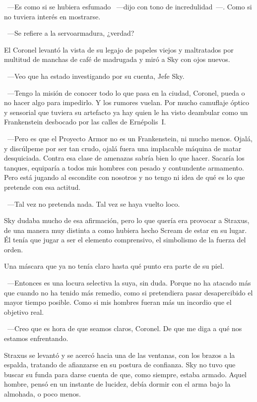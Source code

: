 ~---Es como si se hubiera esfumado ~---dijo con tono de incredulidad~---. Como si no tuviera interés en mostrarse.

~---Se refiere a la servoarmadura, ¿verdad?

El Coronel levantó la vista de su legajo de papeles viejos y maltratados por multitud de manchas de café de madrugada y miró a Sky con ojos nuevos.

~---Veo que ha estado investigando por su cuenta, Jefe Sky.

~---Tengo la misión de conocer todo lo que pasa en la ciudad, Coronel, pueda o no hacer algo para impedirlo. Y los rumores vuelan. Por mucho camuflaje óptico y sensorial que tuviera su artefacto ya hay quien le ha visto deambular como un Frankenstein desbocado por las calles de Ernépolis~I.

~---Pero es que el Proyecto Armor no es un Frankenstein, ni mucho menos. Ojalá, y discúlpeme por ser tan crudo, ojalá fuera una implacable máquina de matar desquiciada. Contra esa clase de amenazas sabría bien lo que hacer. Sacaría los tanques, equiparía a todos mis hombres con pesado y contundente armamento. Pero está jugando al escondite con nosotros y no tengo ni idea de qué es lo que pretende con esa actitud.

~---Tal vez no pretenda nada. Tal vez se haya vuelto loco.

Sky dudaba mucho de esa afirmación, pero lo que quería era provocar a Straxus, de una manera muy distinta a como hubiera hecho Scream de estar en su lugar. Él tenía que jugar a ser el elemento comprensivo, el simbolismo de la fuerza del orden.

Una máscara que ya no tenía claro hasta qué punto era parte de su piel.

~---Entonces es una locura selectiva la suya, sin duda. Porque no ha atacado más que cuando no ha tenido más remedio, como si pretendiera pasar desapercibido el mayor tiempo posible. Como si mis hombres fueran más un incordio que el objetivo real.

~---Creo que es hora de que seamos claros, Coronel. De que me diga a qué nos estamos enfrentando.

Straxus se levantó y se acercó hacia una de las ventanas, con los brazos a la espalda, tratando de afianzarse en su postura de confianza. Sky no tuvo que buscar su funda para darse cuenta de que, como siempre, estaba armado. Aquel hombre, pensó en un instante de lucidez, debía dormir con el arma bajo la almohada, o poco menos.

